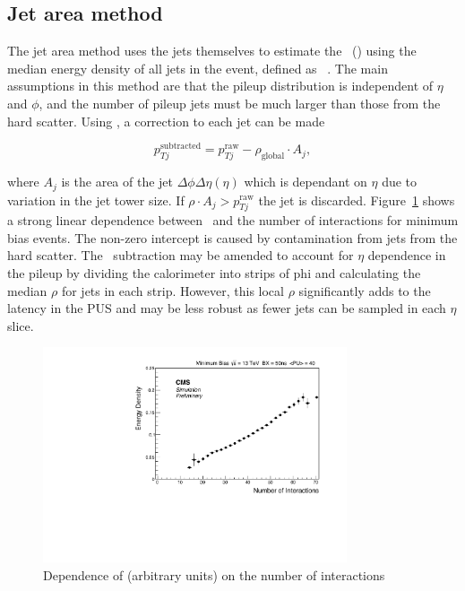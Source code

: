 \subsection{Jet area method}%

The jet area method uses the jets themselves to estimate the \rhoP~(\rhoP) using
the median energy density of all jets in the event, defined as \rhoG~\cite{jet_area}. 
The main assumptions in this method are that the pileup distribution is independent of $\eta$ and $\phi$,  
and the number of pileup jets must be much larger than those from the hard scatter. Using \rhoG, 
a correction to each jet can be made

\begin{equation}
\label{equ:global_rho}
p_{Tj}^{\text{subtracted}} = p_{Tj}^{\text{raw}} - \rho_{\text{global}} \cdot A_j,
\end{equation}


where $A_j$ is the area of the jet $\Delta\phi\Delta\eta(\eta)$ which is dependant on $\eta$ due 
to variation in the jet tower size. If $\rho \cdot A_j > p_{Tj}^{\text{raw}}$ the jet is discarded. 
Figure~\ref{fig:medianNint} shows a strong linear dependence between \rhoG~and the number of interactions for
minimum bias events. The non-zero intercept is caused by contamination from jets from the hard scatter.
The \rhoG~subtraction may be amended to account for $\eta$ dependence in the pileup by 
dividing the calorimeter into strips of phi and calculating the median $\rho$ for jets in each 
strip. However, this local $\rho$ significantly adds to the latency in the PUS and may 
be less robust as fewer jets can be sampled in each $\eta$ slice. 

\begin{figure}
\centering
    \includegraphics[width=0.8\textwidth]{./Figures/triggerUpgrade/median}
  \caption{Dependence of \rhoG (arbitrary units) on the number of interactions}
  \label{fig:medianNint}
\end{figure}  

